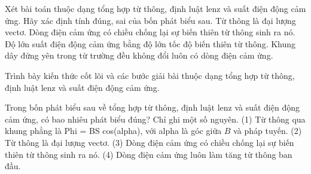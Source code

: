 \begin{ex}
Xét bài toán thuộc dạng tổng hợp từ thông, định luật lenz và suất điện động cảm ứng. Hãy xác định tính đúng, sai của bốn phát biểu sau.
\choiceTF
{Từ thông là đại lượng vectơ.}
{\True Dòng điện cảm ứng có chiều chống lại sự biến thiên từ thông sinh ra nó.}
{\True Độ lớn suất điện động cảm ứng bằng độ lớn tốc độ biến thiên từ thông.}
{Khung dây đứng yên trong từ trường đều không đổi luôn có dòng điện cảm ứng.}
\end{ex}

\begin{bt}
Trình bày kiến thức cốt lõi và các bước giải bài thuộc dạng tổng hợp từ thông, định luật lenz và suất điện động cảm ứng.
\end{bt}

\begin{ex}
Trong bốn phát biểu sau về tổng hợp từ thông, định luật lenz và suất điện động cảm ứng, có bao nhiêu phát biểu đúng? Chỉ ghi một số nguyên. (1) Từ thông qua khung phẳng là Phi = BS cos(alpha), với alpha là góc giữa $B$ và pháp tuyến. (2) Từ thông là đại lượng vectơ. (3) Dòng điện cảm ứng có chiều chống lại sự biến thiên từ thông sinh ra nó. (4) Dòng điện cảm ứng luôn làm tăng từ thông ban đầu.
\end{ex}

